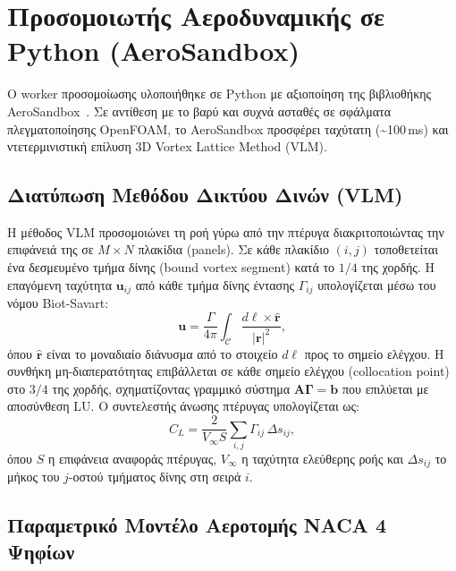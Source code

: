 \section{Προσομοιωτής Αεροδυναμικής σε Python (AeroSandbox)}
\label{sec:impl_worker}

Ο worker προσομοίωσης υλοποιήθηκε σε Python με αξιοποίηση της βιβλιοθήκης AeroSandbox~\cite{sharpe2021aerosandbox}. Σε αντίθεση με το βαρύ και συχνά ασταθές σε σφάλματα πλεγματοποίησης OpenFOAM, το AeroSandbox προσφέρει ταχύτατη (\textasciitilde{}100\,ms) και ντετερμινιστική επίλυση 3D Vortex Lattice Method (VLM).

\subsection{Διατύπωση Μεθόδου Δικτύου Δινών (VLM)}
\label{subsec:impl_vlm}

Η μέθοδος VLM προσομοιώνει τη ροή γύρω από την πτέρυγα διακριτοποιώντας την επιφάνειά της σε $M \times N$ πλακίδια (panels). Σε κάθε πλακίδιο $(i,j)$ τοποθετείται ένα δεσμευμένο τμήμα δίνης (bound vortex segment) κατά το $1/4$ της χορδής. Η επαγόμενη ταχύτητα $\mathbf{u}_{ij}$ από κάθε τμήμα δίνης έντασης $\Gamma_{ij}$ υπολογίζεται μέσω του νόμου Biot-Savart:
\begin{equation}
\label{eq:biot_savart}
\mathbf{u} = \frac{\Gamma}{4\pi} \int_{\mathcal{C}} \frac{d\boldsymbol{\ell} \times \hat{\mathbf{r}}}{|\mathbf{r}|^2},
\end{equation}
όπου $\hat{\mathbf{r}}$ είναι το μοναδιαίο διάνυσμα από το στοιχείο $d\boldsymbol{\ell}$ προς το σημείο ελέγχου. Η συνθήκη μη-διαπερατότητας επιβάλλεται σε κάθε σημείο ελέγχου (collocation point) στο $3/4$ της χορδής, σχηματίζοντας γραμμικό σύστημα $\mathbf{A}\boldsymbol{\Gamma} = \mathbf{b}$ που επιλύεται με αποσύνθεση LU. Ο συντελεστής άνωσης πτέρυγας υπολογίζεται ως:
\begin{equation}
\label{eq:cl_wing}
C_L = \frac{2}{V_\infty S} \sum_{i,j} \Gamma_{ij} \, \Delta s_{ij},
\end{equation}
όπου $S$ η επιφάνεια αναφοράς πτέρυγας, $V_\infty$ η ταχύτητα ελεύθερης ροής και $\Delta s_{ij}$ το μήκος του $j$-οστού τμήματος δίνης στη σειρά $i$.

\subsection{Παραμετρικό Μοντέλο Αεροτομής NACA 4 Ψηφίων}
\label{subsec:impl_naca}

